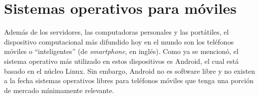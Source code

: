 %
%


\section{Sistemas operativos para móviles}

Además de los servidores, las computadoras personales y las portátiles, el dispositivo computacional más difundido hoy en el mundo son los teléfonos móviles o ``inteligentes'' (de \emph{smartphone}, en inglés). Como ya se mencionó, el sistema operativo más utilizado en estos dispositivos es Android, el cual está basado en el núcleo Linux. Sin embargo, Android no es software libre y no existen a la fecha sistemas operativos libres para teléfonos móviles que tenga una porción de mercado mínimamente relevante.

